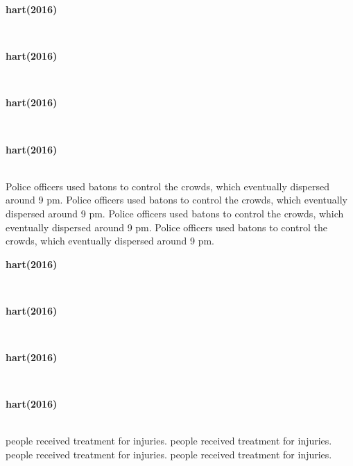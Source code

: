 \documentclass{book}
\begin{document}
	\newpage
	\begin{paracol}{4}
		\noindent
		\centerline{\textbf{hart(2016)}}\\
		\switchcolumn
		\noindent
		\centerline{\textbf{hart(2016)}}\\
		\switchcolumn
		\noindent
		\centerline{\textbf{hart(2016)}}\\
		\switchcolumn
		\noindent
		\centerline{\textbf{hart(2016)}}\\
		\switchcolumn*
		\noindent
Police officers used batons to control the crowds, which eventually dispersed around 9 pm.		\switchcolumn
		\noindent
Police officers used batons to control the crowds, which eventually dispersed around 9 pm.		\switchcolumn
		\noindent
Police officers used batons to control the crowds, which eventually dispersed around 9 pm.		\switchcolumn
		\noindent
Police officers used batons to control the crowds, which eventually dispersed around 9 pm.		\switchcolumn
	\end{paracol}


	\newpage
	\begin{paracol}{4}
		\noindent
		\centerline{\textbf{hart(2016)}}\\
		\switchcolumn
		\noindent
		\centerline{\textbf{hart(2016)}}\\
		\switchcolumn
		\noindent
		\centerline{\textbf{hart(2016)}}\\
		\switchcolumn
		\noindent
		\centerline{\textbf{hart(2016)}}\\
		\switchcolumn*
		 people received treatment for injuries.		\switchcolumn
		 people received treatment for injuries.		\switchcolumn
		 people received treatment for injuries.		\switchcolumn
		 people received treatment for injuries.		\switchcolumn
	\end{paracol}

\end{document}
